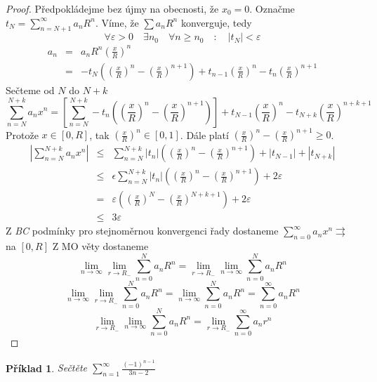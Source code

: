 \documentclass[11pt,a4paper]{article}
\newtheorem*{priklad}{Příklad}
\newcommand{\con}{\rightrightarrows}
\begin{document}
\begin{proof}
Předpokládejme bez újmy na obecnosti, že $x_0 = 0$. Označme $t_N = \sum_{n=N+1}^{\infty} a_n R^n$. Víme, že $\sum a_n R^n$ konverguje, tedy
$$\forall \varepsilon>0 \quad \exists n_0 \quad \forall n \geq n_0 \quad : \quad |t_N| < \varepsilon$$
\begin{eqnarray}
a_n & = & a_n R^n \left( \frac{x}{R} \right)^n \nonumber\\
& = & - t_N \left( \left( \frac{x}{R} \right)^n - \left( \frac{x}{R} \right)^{n+1} \right) + t_{n-1} \left( \frac{x}{R} \right)^n - t_n \left( \frac{x}{R} \right)^{n+1} \nonumber
\end{eqnarray}
Sečteme od $N$ do $N+k$
$$\sum_{n=N}^{N+k} a_n x^n = \left[ \sum_{n=N}^{N+k} -t_n \left( \left( \frac{x}{R} \right)^n - \left( \frac{x}{R} \right)^{n+1} \right) \right] + t_{N-1} \left( \frac{x}{R} \right)^n - t_{N+k} \left( \frac{x}{R} \right)^{n+k+1}$$
Protože $x \in [0, R]$, tak $\left( \frac{x}{R} \right)^n \in [0,1]$. Dále platí $\left( \frac{x}{R} \right)^{n} - \left( \frac{x}{R} \right)^{n+1} \geq 0$.
\begin{eqnarray}
\left|\sum_{n=N}^{N+k} a_n x^n \right| & \leq & \sum_{n=N}^{N+k} |t_n| \left( \left( \frac{x}{R} \right)^{n} - \left( \frac{x}{R} \right)^{n+1} \right) + |t_{N-1}| + |t_{N+k}| \nonumber\\
& \leq & \epsilon \sum_{n=N}^{N+k} |t_n| \left( \left( \frac{x}{R} \right)^{n} - \left( \frac{x}{R} \right)^{n+1} \right) + 2 \varepsilon \nonumber\\
& = & \varepsilon \left( \left( \frac{x}{R} \right)^{N} - \left( \frac{x}{R} \right)^{N+k+1} \right) + 2 \varepsilon \nonumber\\
& \leq & 3 \varepsilon \nonumber
\end{eqnarray}
Z \emph{BC} podmínky pro stejnoměrnou konvergenci řady dostaneme $\sum_{n=0}^{\infty} a_n x^n \con$ na $[0, R]$
Z MO věty dostaneme
$$\lim_{n \rightarrow \infty} \lim_{r \rightarrow R_-} \sum_{n=0}^{N} a_n R^n = \lim_{r \rightarrow R_-} \lim_{n \rightarrow \infty} \sum_{n=0}^{N} a_n R^n$$
$$\lim_{n \rightarrow \infty} \lim_{r \rightarrow R_-} \sum_{n=0}^{N} a_n R^n = \lim_{n \rightarrow \infty} \sum_{n=0}^{N} a_n R^n = \sum_{n=0}^{\infty} a_n R^n$$
$$\lim_{r \rightarrow R_-} \lim_{n \rightarrow \infty} \sum_{n=0}^{N} a_n R^n = \lim_{r \rightarrow R_-} \sum_{n=0}^{\infty} a_n r^n$$
\end{proof}

\begin{priklad}
Sečtěte $\sum_{n=1}^{\infty} \frac{(-1)^{n-1}}{3n-2}$
\end{priklad}
\end{document}
